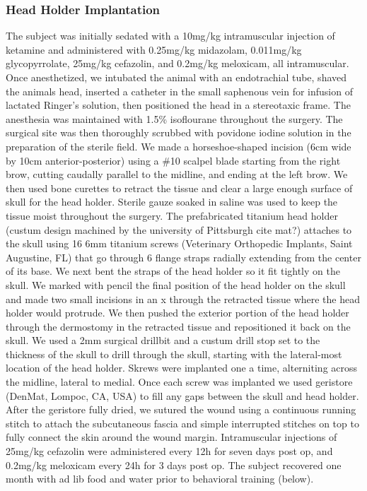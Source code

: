 \subsubsection*{Head Holder Implantation} The subject was initially sedated with a 10mg/kg intramuscular injection of ketamine and administered with 0.25mg/kg midazolam, 0.011mg/kg glycopyrrolate, 25mg/kg cefazolin, and 0.2mg/kg meloxicam, all intramuscular. Once anesthetized, we intubated the animal with an endotrachial tube, shaved the animals head, inserted a catheter in the small saphenous vein for infusion of lactated Ringer's solution, then positioned the head in a stereotaxic frame. The anesthesia was maintained with 1.5\% isoflourane throughout the surgery. The surgical site was then thoroughly scrubbed with povidone iodine solution in the preparation of the sterile field. We made a horseshoe-shaped incision (6cm wide by 10cm anterior-posterior) using a \#10 scalpel blade starting from the right brow, cutting caudally parallel to the midline, and ending at the left brow. We then used bone curettes to retract the tissue and clear a large enough surface of skull for the head holder. Sterile gauze soaked in saline was used to keep the tissue moist throughout the surgery. The prefabricated titanium head holder (custum design machined by the university of Pittsburgh cite mat?) attaches to the skull using 16 6mm titanium screws (Veterinary Orthopedic Implants, Saint Augustine, FL) that go through 6 flange straps radially extending from the center of its base. We next bent the straps of the head holder so it fit tightly on the skull. We marked with pencil the final position of the head holder on the skull and made two small incisions in an x through the retracted tissue where the head holder would protrude. We then pushed the exterior portion of the head holder through the dermostomy in the retracted tissue and repositioned it back on the skull. We used a 2mm surgical drillbit and a custum drill stop set to the thickness of the skull to drill through the skull, starting with the lateral-most location of the head holder. Skrews were implanted one a time, alterniting across the midline, lateral to medial. Once each screw was implanted we used geristore (DenMat, Lompoc, CA, USA) to fill any gaps between the skull and head holder. After the geristore fully dried, we sutured the wound using a continuous running stitch to attach the subcutaneous fascia and simple interrupted stitches on top to fully connect the skin around the wound margin. Intramuscular injections of 25mg/kg cefazolin were administered every 12h for seven days post op, and 0.2mg/kg meloxicam every 24h for 3 days post op. The subject recovered one month with ad lib food and water prior to behavioral training (below).

